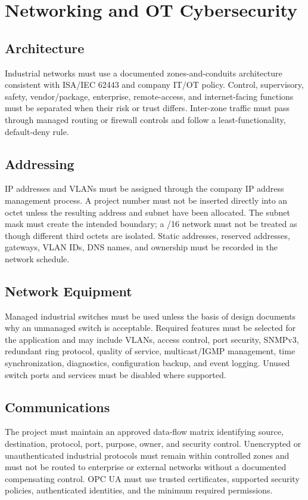 \chapter{Networking and OT Cybersecurity}
\section{Architecture}
Industrial networks must use a documented zones-and-conduits architecture consistent with ISA/IEC 62443 and company IT/OT policy. Control, supervisory, safety, vendor/package, enterprise, remote-access, and internet-facing functions must be separated when their risk or trust differs. Inter-zone traffic must pass through managed routing or firewall controls and follow a least-functionality, default-deny rule.

\section{Addressing}
IP addresses and VLANs must be assigned through the company IP address management process. A project number must not be inserted directly into an octet unless the resulting address and subnet have been allocated. The subnet mask must create the intended boundary; a /16 network must not be treated as though different third octets are isolated. Static addresses, reserved addresses, gateways, VLAN IDs, DNS names, and ownership must be recorded in the network schedule.

\section{Network Equipment}
Managed industrial switches must be used unless the basis of design documents why an unmanaged switch is acceptable. Required features must be selected for the application and may include VLANs, access control, port security, SNMPv3, redundant ring protocol, quality of service, multicast/IGMP management, time synchronization, diagnostics, configuration backup, and event logging. Unused switch ports and services must be disabled where supported.

\section{Communications}
The project must maintain an approved data-flow matrix identifying source, destination, protocol, port, purpose, owner, and security control. Unencrypted or unauthenticated industrial protocols must remain within controlled zones and must not be routed to enterprise or external networks without a documented compensating control. OPC UA must use trusted certificates, supported security policies, authenticated identities, and the minimum required permissions.

